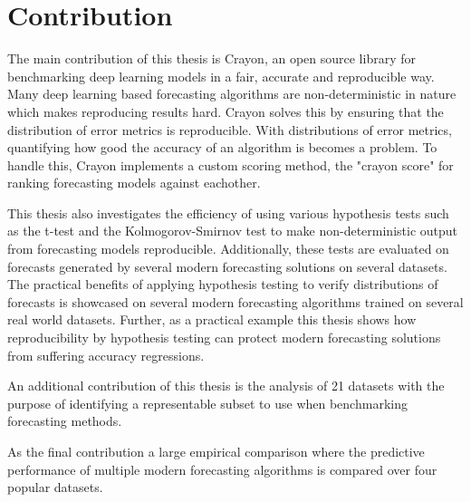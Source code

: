 \section{Contribution}
\label{section:contribution}

The main contribution of this thesis is Crayon, an open source library for benchmarking deep learning models in a fair, accurate and reproducible way. Many deep learning based forecasting algorithms are non-deterministic in nature which makes reproducing results hard. Crayon solves this by ensuring that the distribution of error metrics is reproducible. With distributions of error metrics, quantifying how good the accuracy of an algorithm is becomes a problem. To handle this, Crayon implements a custom scoring method, the "crayon score" for ranking forecasting models against eachother. 

This thesis also investigates the efficiency of using various hypothesis tests such as the t-test and the Kolmogorov-Smirnov test to make non-deterministic output from forecasting models reproducible. Additionally, these tests are evaluated on forecasts generated by several modern forecasting solutions on several datasets. The practical benefits of applying hypothesis testing to verify distributions of forecasts is showcased on several modern forecasting algorithms trained on several real world datasets. Further, as a practical example this thesis shows how reproducibility by hypothesis testing can protect modern forecasting solutions from suffering accuracy regressions. 

An additional contribution of this thesis is the analysis of 21 datasets with the purpose of identifying a representable subset to use when benchmarking forecasting methods.

As the final contribution a large empirical comparison where the predictive performance of multiple modern forecasting algorithms is compared over four popular datasets.
